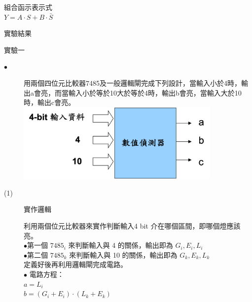 \documentclass[12pt, a4paper]{article}
\begin{document}
\begin{description}
\begin{enumerate}
\begin{description}
\begin{table}[h]
\begin{adjustbox}{width=.15\textwidth}
                      \end{adjustbox}
                      \end{table}
                  \item [(2)] 組合函示表示式\\ 
                      $Y = A\cdot S + B\cdot \bar S$
              \end{description}
              \normalsize
        \normalsize
      \end{enumerate}
    \item [二、]實驗結果
      \newpage
      \begin{description}
        \fontsize{20pt}{22pt}\selectfont
        \item [1.]實驗一
          \fontsize{16pt}{18pt}\selectfont
            \begin{description}
              \item [$\bullet$]用兩個四位元比較器7485及一般邏輯閘完成下列設計，當輸入小於4時，輸出a會亮，而當輸入小於等於10大於等於4時，輸出b會亮，當輸入大於10時，輸出c會亮。 \\[.2cm]
              \includegraphics[width=10cm]{./image/ex1_p.png}
              \fontsize{18pt}{20pt}
              \item [(1)]實作邏輯 \\[.3cm]
                \begin{samepage}
                  \fontsize{16pt}{18pt}
                  利用兩個位元比較器來實作判斷輸入4 bit 介在哪個區間，即哪個燈應該亮。\\
                  $\bullet$第一個 $7485_{i}$ 來判斷輸入與 4 的關係，輸出即為 $G_{i}, E_{i}, L_{i}$\\
                  $\bullet$第二個 $7485_{k}$ 來判斷輸入與 10 的關係，輸出即為 $G_{k}, E_{k}, L_{k}$\\
                  定義好後再利用邏輯閘完成電路。\\
                  $\bullet$ 電路方程：\\
                  \bf$a = L_{i}$\\
                  $b = (G_{i} + E_{i})\cdot (L_{k} + E_{k})$\\

\end{samepage}
\end{description}
\end{description}
\end{description}
\end{document}
